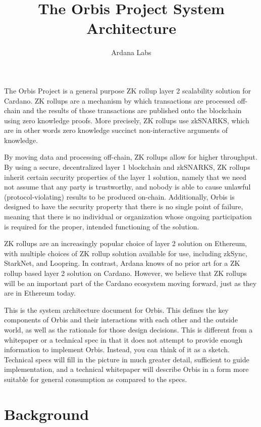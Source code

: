 \documentclass[12pt]{article}
\title{The Orbis Project System Architecture}
\author{Ardana Labs}
\begin{document}
\maketitle


The Orbis Project is a general purpose ZK rollup layer 2 scalability solution for Cardano. ZK rollups are a mechanism by which transactions are processed off-chain and the results of those transactions are published onto the blockchain using zero knowledge proofs. More precisely, ZK rollups use zkSNARKS, which are in other words zero knowledge succinct non-interactive arguments of knowledge.

By moving data and processing off-chain, ZK rollups allow for higher throughput. By using a secure, decentralized layer 1 blockchain and zkSNARKS, ZK rollups inherit certain security properties of the layer 1 solution, namely that we need not assume that any party is trustworthy, and nobody is able to cause unlawful (protocol-violating) results to be produced on-chain. Additionally, Orbis is designed to have the security property that there is no single point of failure, meaning that there is no individual or organization whose ongoing participation is required for the proper, intended functioning of the solution.

ZK rollups are an increasingly popular choice of layer 2 solution on Ethereum, with multiple choices of ZK rollup solution available for use, including zkSync, StarkNet, and Loopring. \cite{ethworks-20} In contrast, Ardana knows of no prior art for a ZK rollup based layer 2 solution on Cardano. However, we believe that ZK rollups will be an important part of the Cardano ecosystem moving forward, just as they are in Ethereum today.

This is the system architecture document for Orbis. This defines the key components of Orbis and their interactions with each other and the outside world, as well as the rationale for those design decisions. This is different from a whitepaper or a technical spec in that it does not attempt to provide enough information to implement Orbis. Instead, you can think of it as a sketch. Technical specs will fill in the picture in much greater detail, sufficient to guide implementation, and a technical whitepaper will describe Orbis in a form more suitable for general consumption as compared to the specs.

\section{Background}
\end{document}

